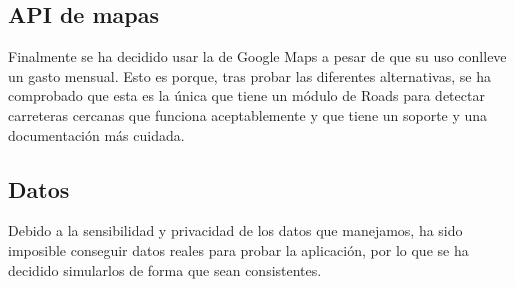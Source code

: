   \subsection{API de mapas}
    Finalmente se ha decidido usar la  de Google Maps\cite{gmaps} a pesar de que su uso conlleve un gasto mensual. Esto es porque, tras probar las diferentes alternativas, se ha comprobado que esta  es la única que tiene un módulo de Roads para detectar carreteras cercanas que funciona aceptablemente y que tiene un soporte y una documentación más cuidada.
    
    
  \subsection{Datos}
    Debido a la sensibilidad y privacidad de los datos que manejamos, ha sido imposible conseguir datos reales para probar la aplicación, por lo que se ha decidido simularlos de forma que sean consistentes. %
